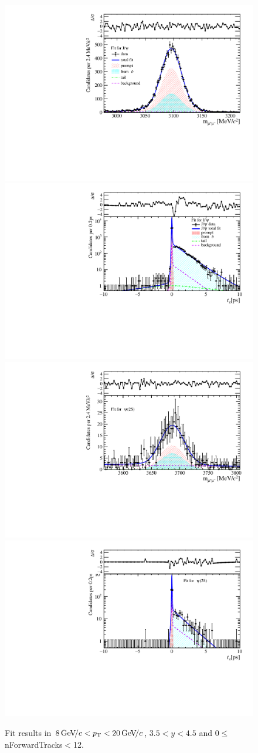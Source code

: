\begin{figure}[H]
\begin{center}
\includegraphics[width=0.47\linewidth]{pdf/Jpsi/drawmassF/n1y3pt5.pdf}
\includegraphics[width=0.47\linewidth]{pdf/Jpsi/2DFitF/n1y3pt5.pdf}
\vspace*{-0.5cm}
\includegraphics[width=0.47\linewidth]{pdf/Psi2S/drawmassF/n1y3pt5.pdf}
\includegraphics[width=0.47\linewidth]{pdf/Psi2S/2DFitF/n1y3pt5.pdf}
\vspace*{-0.5cm}
\end{center}
\caption{Fit results in $8\text{\,Ge\kern -0.1em V\!/}c<p_{\mathrm{T}}<20\text{\,Ge\kern -0.1em V\!/}c$, $3.5<y<4.5$ and 0$\leq$nForwardTracks$<$12.}
\label{Fitn1y3pt5}
\end{figure}
